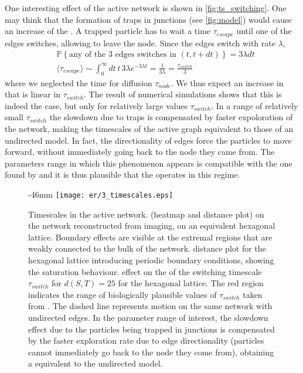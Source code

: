 One interesting effect of the active network is shown in \cref{fig:ts_switching}. One may think that the formation of traps in junctions (see \cref{fig:model}) would cause an increase of the . A trapped particle has to wait a time $\tau_{escape}$ until one of the edges switches, allowing to leave the node. Since the edges switch with rate $\lambda$,
\begin{align}
  &\mathbb{P}\left\{ \text{any of the 3 edges switches in }(t, t + dt)\right\} = 3\lambda dt\\
  &\langle \tau_{escape}\rangle \sim \int_{0}^{\infty} dt \,t\,3\lambda e^{-3\lambda t} = \frac{1}{3\lambda} = \frac{\tau_{switch}}{3}
\end{align}
where we neglected the time for diffusion $\tau_{node}$. We thus expect an increase in  that is linear in $\tau_{switch}$. The result of numerical simulations shows that this is indeed the case, but only for relatively large values $\tau_{switch}$. In a range of relatively small $\tau_{switch}$ the slowdown due to traps is compensated by faster expoloration of the network, making the timescales of the active graph equivalent to those of an undirected model. In fact, the directionality of edges force the particles to move forward, without immediately going back to the node they came from. The parameters range in which this phenomenon appears is compatible with the one found by \citeauthor{holcman2018single} and it is thus plausible that the  operates in this regime.

\begin{figure}
  \begin{adjustwidth*}{}{-46mm}
    \texttt{[image: er/3\_timescales.eps]}%
    {{\label{fig:ts_er}}%
    {\label{fig:ts_hex}}%
    {\label{fig:ts_hex_pbc}}%
    {\label{fig:ts_switching}}}%
    \caption{Timescales in the active network.
    \enskip{} (heatmap and distance plot) on the network reconstructed from  imaging, \enskip{} on an equivalent hexagonal lattice. Boundary effects are visible at the extremal regions that are weakly connected to the bulk of the network.   distance plot for the hexagonal lattice introducing periodic boundary conditions, showing the saturation behaviour.
    \enskip effect on the  of the switching timescale $\tau_{switch}$ for $d(S, T) = 25$ for the hexagonal lattice. The red region indicates the range of biologically plausible values of $\tau_{switch}$ taken from \cite{holcman2018single}. The dashed line represents motion on the same network with undirected edges. In the parameter range of interest, the slowdown effect due to the particles being trapped in junctions is compensated by the faster exploration rate due to edge directionality (particles cannot immediately go back to the node they come from), obtaining a  equivalent to the undirected model.\label{fig:ts}}
  \end{adjustwidth*}
\end{figure}

